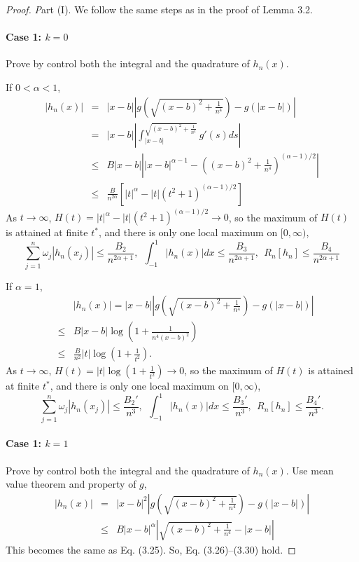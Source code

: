 \documentclass[11pt]{article}
\begin{document}
\begin{proof} {\textit Part (I).} We follow the same steps as in the proof of Lemma 3.2.

\paragraph{Case 1: $k=0$} Prove by control both the integral and the quadrature of $h_n(x)$. 

If $0<\alpha<1$,
\begin{eqnarray}
    |h_n(x)|&=&|x-b|\left|g(\sqrt{(x-b)^2+\frac{1}{n^4}}) - g(|x-b|)\right|
    \nonumber \\ 
    &=&  |x-b| \left|\int_{|x-b|}^{\sqrt{(x-b)^2+\frac{1}{n^4}}} g'(s) ds \right| \nonumber \\ 
    &\leq& B |x-b| \left||x-b|^{\alpha-1} - \left((x-b)^2+\frac{1}{n^4}\right)^{(\alpha-1)/2} \right|\\ 
    &\leq& \frac{B}{n^{2\alpha}} \left[|t|^{\alpha} - |t|\left(t^2+1\right)^{(\alpha-1)/2} \right]
\end{eqnarray}
As $t \to \infty$, $H(t) =|t|^{\alpha} - |t|\left(t^2+1\right)^{(\alpha-1)/2} \to 0$, so the maximum of $H(t)$ is attained at finite $t^*$, and there is only one local maximum on $[0,\infty)$,
\begin{equation}
    \sum_{j=1}^n \omega_j |h_n(x_j)|  \leq \frac{B_2}{n^{2\alpha+1}}, \ \ \int_{-1}^1 |h_n(x)| dx \leq \frac{B_3}{n^{2\alpha+1}}, \ \ R_n[h_n] \leq \frac{B_4}{n^{2\alpha+1}}
\end{equation}

If $\alpha=1$,
\begin{eqnarray}
    &&|h_n(x)|=|x-b|\left|g(\sqrt{(x-b)^2+\frac{1}{n^4}}) - g(|x-b|)\right| \nonumber \\ 
    &\leq& B |x-b| \log\left(1+\frac{1}{n^4(x-b)^2}\right) \\
    &\leq& \frac{B}{n^{2}} |t| \log(1+\frac{1}{t^2}).
\end{eqnarray}
As $t \to \infty$, $H(t) =|t| \log(1+\frac{1}{t^2}) \to 0$, so the maximum of $H(t)$ is attained at finite $t^*$, and there is only one local maximum on $[0,\infty)$,
\begin{equation}
    \sum_{j=1}^n \omega_j |h_n(x_j)|  \leq \frac{B_2' }{n^{3}}, \ \ \int_{-1}^1 |h_n(x)| dx \leq \frac{B_3' }{n^{3}}, \ \ R_n[h_n] \leq \frac{B_4'}{n^{3}}.
\end{equation}

\paragraph{Case 1: $k=1$} Prove by control both the integral and the quadrature of $h_n(x)$.  Use mean value theorem and property of $g$,
\begin{eqnarray}
    |h_n(x)|&=&|x-b|^{2}\left|g(\sqrt{(x-b)^2+\frac{1}{n^4}}) - g(|x-b|)\right| \nonumber \\ 
    &\leq& B |x-b|^{\alpha}\left|\sqrt{(x-b)^2+\frac{1}{n^4}} - |x-b|\right|
\end{eqnarray}
This becomes the same as Eq. (3.25). So, Eq. (3.26)--(3.30) hold.


\end{proof}
\end{document}
